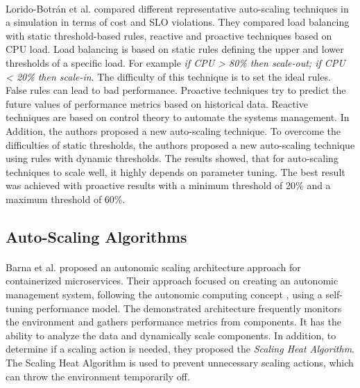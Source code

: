 \paragraph{}Lorido-Botrán et al.  \cite{Botran2013AutoScalingComp} compared different representative auto-scaling techniques in a simulation in terms of cost and SLO violations. They compared load balancing with static threshold-based rules, reactive and proactive techniques based on CPU load.
Load balancing is based on static rules defining the upper and lower thresholds of a specific load. For example \textit{if CPU > 80\% then scale-out; if CPU < 20\% then scale-in}. The difficulty of this technique is to set the ideal rules. False rules can lead to bad performance. Proactive techniques try to predict the future values of performance metrics based on historical data. Reactive techniques are based on control theory to automate the systems management. In Addition, the authors proposed a new auto-scaling technique. To overcome the difficulties of static thresholds, the authors proposed a new auto-scaling technique using rules with dynamic thresholds. The results showed, that for auto-scaling techniques to scale well, it highly depends on parameter tuning. The best result was achieved with proactive results with a minimum threshold of 20\% and a maximum threshold of 60\%.


\subsection{Auto-Scaling Algorithms}
\paragraph{}Barna et al. \cite{Barna2017ElasticContainerApps} proposed an autonomic scaling architecture approach for containerized microservices. Their approach focused on creating an autonomic management system, following the autonomic computing concept \cite{Kephart2003VisionComputing}, using a self-tuning performance model. The demonstrated architecture frequently monitors the environment and gathers performance metrics from components. It has the ability to analyze the data and dynamically scale components. In addition, to determine if a scaling action is needed, they proposed the \textit{Scaling Heat Algorithm}. The Scaling Heat Algorithm is used to prevent unnecessary scaling actions, which can throw the environment temporarily off.



